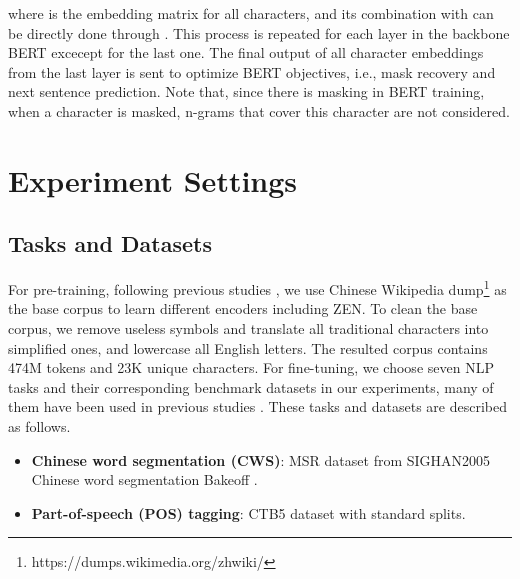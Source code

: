 \documentclass[11pt,a4paper]{article}
\begin{document}
\begin{CJK}{UTF8}{gbsn}
where  is the embedding matrix for all characters,
and its combination with  can be directly done through .
This process is repeated for each layer in the backbone BERT excecept for the last one. The final output of all character embeddings from the last layer is sent to optimize BERT objectives, i.e., mask recovery and next sentence prediction.
Note that, since there is masking in BERT training, when a character is masked,
n-grams that cover this character are not considered.














\section{Experiment Settings}






\subsection{Tasks and Datasets}



For pre-training, following previous studies \cite{devlin2018bert,cui2019pre}, we use Chinese Wikipedia dump\footnote{https://dumps.wikimedia.org/zhwiki/} as the base corpus to learn different encoders including ZEN.
To clean the base corpus, we remove useless symbols and translate all traditional characters into simplified ones, and lowercase all English letters.
The resulted corpus contains 474M tokens and 23K unique characters.
For fine-tuning, we choose seven NLP tasks and their corresponding benchmark datasets in our experiments, many of them have been used in previous studies \citep{cui2019pre, sun2019ernie, sun2019ernie2}.
These tasks and datasets are described as follows.





\vspace{-0.15cm}
\begin{itemize}[leftmargin=10pt]
    \itemsep-0.15em
\item{\textbf{Chinese word segmentation (CWS)}}: MSR dataset from SIGHAN2005 Chinese word segmentation Bakeoff \citep{emerson2005second}.


\item{\textbf{Part-of-speech (POS) tagging}}: CTB5 \citep{Xue2005The} dataset with standard splits.



\end{itemize}
\end{CJK}
\end{document}
